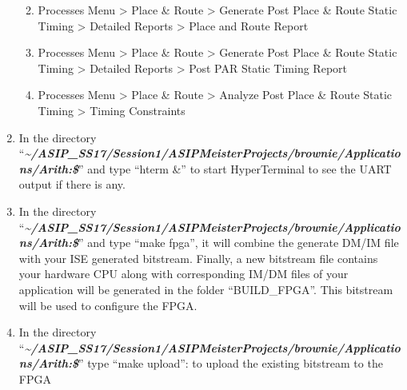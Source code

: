 \begin{enumerate}
	\begin{enumerate}
		\def\labelenumii{\alph{enumii}.}
		\item
		Processes Menu \textgreater{} Place \& Route \textgreater{} Generate
		Post Place \& Route Static Timing \textgreater{} Detailed Reports
		\textgreater{} Place and Route Report
		\item
		Processes Menu \textgreater{} Place \& Route \textgreater{} Generate
		Post Place \& Route Static Timing \textgreater{} Detailed Reports
		\textgreater{} Post PAR Static Timing Report
		\item
		Processes Menu \textgreater{} Place \& Route \textgreater{} Analyze
		Post Place \& Route Static Timing \textgreater{} Timing Constraints
	\end{enumerate}
	\item
	In the directory 
	``\emph{\small{\textbf{\textasciitilde/ASIP\_SS17/Session1/ASIPMeisterProjects/brownie/Applications/Arith:\$}}}''
	and type ``hterm \&'' to start HyperTerminal to see the UART output if
	there is any.
	\item
	In the directory 
	``\emph{\small{\textbf{\textasciitilde/ASIP\_SS17/Session1/ASIPMeisterProjects/brownie/Applications/Arith:\$}}}''
	and type ``make fpga'', it will combine the generate DM/IM file with
	your ISE generated bitstream. Finally, a new bitstream file contains
	your hardware CPU along with corresponding IM/DM files of your
	application will be generated in the folder ``BUILD\_FPGA''. This
	bitstream will be used to configure the FPGA.
	\item
	In the directory
	``\emph{\small{\textbf{\textasciitilde/ASIP\_SS17/Session1/ASIPMeisterProjects/brownie/Applications/Arith:\$}}}''
	type ``make upload'': to upload the existing bitstream to the FPGA
\end{enumerate}
